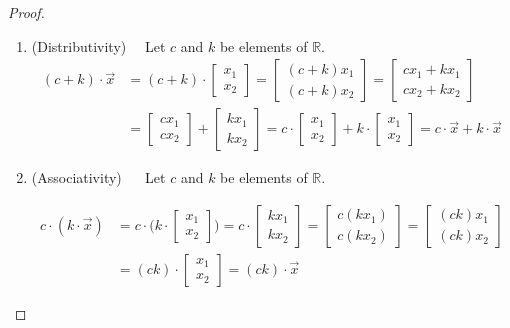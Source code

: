 \begin{proof}
\begin{enumerate}
\item (Distributivity)~~  Let $c$ and $k$ be elements of $\mathbb{R}$. 
%
\begin{align*}
 (c + k)\cdot  \vec{x} & = (c+k) \cdot 
\begin{bmatrix}
 x_1 \\ x_2 
\end{bmatrix} = 
\begin{bmatrix}
 (c+k) x_1 \\ (c+k) x_2 
\end{bmatrix} = 
\begin{bmatrix}
 c x_1 + k x_1 \\
 c x_2 + k x_2 
\end{bmatrix} \\
& = 
\begin{bmatrix}
 c  x_1 \\ c x_2 
\end{bmatrix} + 
\begin{bmatrix}
 k x_1 \\ k x_2 
\end{bmatrix} = c \cdot 
\begin{bmatrix}
 x_1 \\ x_2 
\end{bmatrix} + k \cdot 
\begin{bmatrix}
 x_1 \\ x_2 
\end{bmatrix} = c \cdot \vec{x} + k \cdot \vec{x} 
\end{align*}

\item (Associativity) ~~ Let $c$ and $k$ be elements of $\mathbb{R}$. 

\begin{align*}
 c\cdot (k\cdot \vec{x}) & = c \cdot \biggl( k \cdot 
\begin{bmatrix}
 x_1 \\ x_2 
\end{bmatrix} \biggr) = c \cdot 
\begin{bmatrix}
 k x_1 \\ k x_2 
\end{bmatrix} = 
\begin{bmatrix}
 c (k x_1) \\ c (kx_2) 
\end{bmatrix} = 
\begin{bmatrix}
 (c k) x_1 \\ (ck) x_2 
\end{bmatrix} \\
& = (ck) \cdot 
\begin{bmatrix}
 x_1 \\ x_2 
\end{bmatrix} = (ck) \cdot \vec{x} 
\end{align*}


\end{enumerate}
\end{proof}

